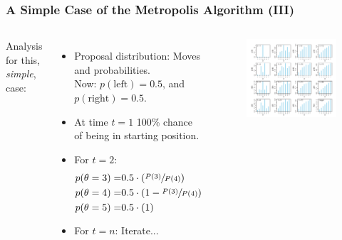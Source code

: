 \documentclass[usenames,dvipsnames,table]{beamer}
\begin{document}
\begin{frame}
\frametitle{A Simple Case of the Metropolis Algorithm (III)}
\begin{columns}[c]
Analysis for this, \emph{simple}, case:

\begin{itemize}
\item Proposal distribution: Moves and probabilities.\\
      Now: $p(\mathrm{left})=0.5$, and $p(\mathrm{right})=0.5$.
\item At time $t=1$ 100\% chance of being in starting position.
\item For $t=2$: \begin{align*}
                    p(\theta=3) =& 0.5 \cdot (\sfrac{P(3)}{P(4)}) \\
                    p(\theta=4) =& 0.5 \cdot (1 - \sfrac{P(3)}{P(4)}) \\
                    p(\theta=5) =& 0.5 \cdot (1)
                 \end{align*}
\item For $t=n$: Iterate...
\end{itemize}
\begin{figure}
\centering
\includegraphics[height=0.6\textheight]{img/fig7_3}
\end{figure}
\end{columns}
\end{frame}
\end{document}
